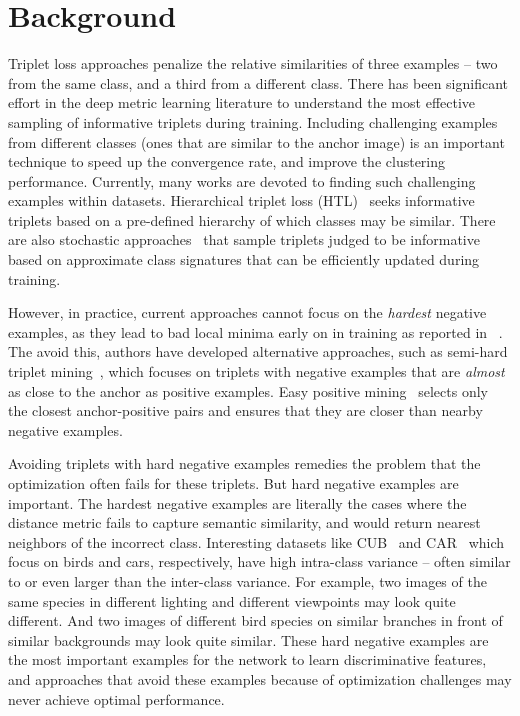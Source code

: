 \documentclass[runningheads]{llncs}
\begin{document}
\section{Background}
Triplet loss approaches penalize the relative similarities of three examples  -- two from the same class, and a third from a different class. There has been significant effort in the deep metric learning literature to understand the most effective sampling of informative triplets during training. Including challenging examples from different classes (ones that are similar to the anchor image) is an important technique to speed up the convergence rate, and improve the clustering performance. Currently, many works are devoted to finding such challenging examples within datasets. Hierarchical triplet loss (HTL)~\cite{HTL} seeks informative triplets based on a pre-defined hierarchy of which classes may be similar. There are also stochastic approaches~\cite{Suh_2019_CVPR} that sample triplets judged to be informative based on approximate class signatures that can be efficiently updated during training. 

However, in practice, current approaches cannot focus on the \textit{hardest} negative examples, as they lead to bad local minima early on in training as reported in ~\cite{xuan2019improved,facenet,faghri2018vse++,ge2019visual,SOP,wang2017train,yu2018correcting}.   The avoid this, authors have developed alternative approaches, such as semi-hard triplet mining~\cite{facenet}, which focuses on triplets with negative examples that are \textit{almost} as close to the anchor as positive examples.  Easy positive mining~\cite{xuan2019improved} selects only the closest anchor-positive pairs and ensures that they are closer than nearby negative examples.


Avoiding triplets with hard negative examples remedies the problem that the optimization often fails for these triplets. But hard negative examples are important. The hardest negative examples are literally the cases where the distance metric fails to capture semantic similarity, and would return nearest neighbors of the incorrect class. Interesting datasets like CUB~\cite{CUB200} and CAR~\cite{CAR196} which focus on birds and cars, respectively, have high intra-class variance -- often similar to or even larger than the inter-class variance. For example, two images of the same species in different lighting and different viewpoints may look quite different.  And two images of different bird species on similar branches in front of similar backgrounds may look quite similar. These hard negative examples are the most important examples for the network to learn discriminative features, and approaches that avoid these examples because of optimization challenges may never achieve optimal performance. 
\end{document}
